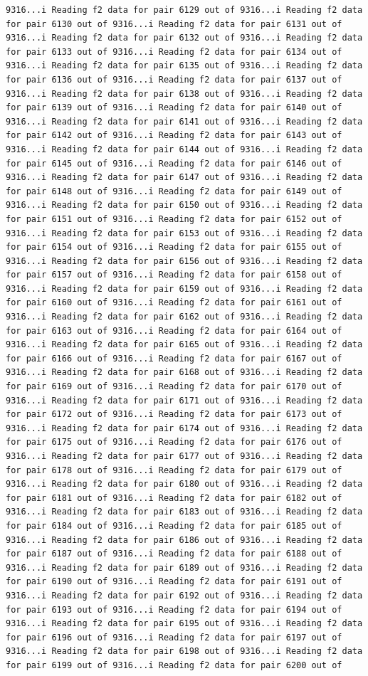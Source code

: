 \documentclass[
]{article}
\begin{document}
\begin{verbatim}
9316...i Reading f2 data for pair 6129 out of 9316...i Reading f2 data for pair 6130 out of 9316...i Reading f2 data for pair 6131 out of 9316...i Reading f2 data for pair 6132 out of 9316...i Reading f2 data for pair 6133 out of 9316...i Reading f2 data for pair 6134 out of 9316...i Reading f2 data for pair 6135 out of 9316...i Reading f2 data for pair 6136 out of 9316...i Reading f2 data for pair 6137 out of 9316...i Reading f2 data for pair 6138 out of 9316...i Reading f2 data for pair 6139 out of 9316...i Reading f2 data for pair 6140 out of 9316...i Reading f2 data for pair 6141 out of 9316...i Reading f2 data for pair 6142 out of 9316...i Reading f2 data for pair 6143 out of 9316...i Reading f2 data for pair 6144 out of 9316...i Reading f2 data for pair 6145 out of 9316...i Reading f2 data for pair 6146 out of 9316...i Reading f2 data for pair 6147 out of 9316...i Reading f2 data for pair 6148 out of 9316...i Reading f2 data for pair 6149 out of 9316...i Reading f2 data for pair 6150 out of 9316...i Reading f2 data for pair 6151 out of 9316...i Reading f2 data for pair 6152 out of 9316...i Reading f2 data for pair 6153 out of 9316...i Reading f2 data for pair 6154 out of 9316...i Reading f2 data for pair 6155 out of 9316...i Reading f2 data for pair 6156 out of 9316...i Reading f2 data for pair 6157 out of 9316...i Reading f2 data for pair 6158 out of 9316...i Reading f2 data for pair 6159 out of 9316...i Reading f2 data for pair 6160 out of 9316...i Reading f2 data for pair 6161 out of 9316...i Reading f2 data for pair 6162 out of 9316...i Reading f2 data for pair 6163 out of 9316...i Reading f2 data for pair 6164 out of 9316...i Reading f2 data for pair 6165 out of 9316...i Reading f2 data for pair 6166 out of 9316...i Reading f2 data for pair 6167 out of 9316...i Reading f2 data for pair 6168 out of 9316...i Reading f2 data for pair 6169 out of 9316...i Reading f2 data for pair 6170 out of 9316...i Reading f2 data for pair 6171 out of 9316...i Reading f2 data for pair 6172 out of 9316...i Reading f2 data for pair 6173 out of 9316...i Reading f2 data for pair 6174 out of 9316...i Reading f2 data for pair 6175 out of 9316...i Reading f2 data for pair 6176 out of 9316...i Reading f2 data for pair 6177 out of 9316...i Reading f2 data for pair 6178 out of 9316...i Reading f2 data for pair 6179 out of 9316...i Reading f2 data for pair 6180 out of 9316...i Reading f2 data for pair 6181 out of 9316...i Reading f2 data for pair 6182 out of 9316...i Reading f2 data for pair 6183 out of 9316...i Reading f2 data for pair 6184 out of 9316...i Reading f2 data for pair 6185 out of 9316...i Reading f2 data for pair 6186 out of 9316...i Reading f2 data for pair 6187 out of 9316...i Reading f2 data for pair 6188 out of 9316...i Reading f2 data for pair 6189 out of 9316...i Reading f2 data for pair 6190 out of 9316...i Reading f2 data for pair 6191 out of 9316...i Reading f2 data for pair 6192 out of 9316...i Reading f2 data for pair 6193 out of 9316...i Reading f2 data for pair 6194 out of 9316...i Reading f2 data for pair 6195 out of 9316...i Reading f2 data for pair 6196 out of 9316...i Reading f2 data for pair 6197 out of 9316...i Reading f2 data for pair 6198 out of 9316...i Reading f2 data for pair 6199 out of 9316...i Reading f2 data for pair 6200 out of 
\end{verbatim}
\end{document}

